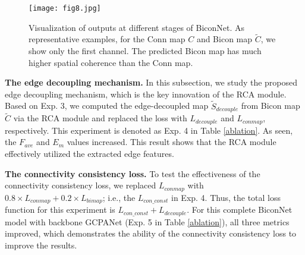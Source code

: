 \documentclass[final]{cvpr}
\begin{document}
\begin{table}[h]
\renewcommand\arraystretch{1.2}
\centering
{}

\end{table}

\begin{figure}[h]
\begin{center}
   \texttt{[image: fig8.jpg]}
\end{center}
\vspace{-8pt}
\caption{Visualization of outputs at different stages of BiconNet. As representative examples, for the Conn map $C$ and Bicon map $\widetilde{C}$, we show only the first channel. The predicted Bicon map has much higher spatial coherence than the Conn map.}
\label{BV_visualization}
\vspace{-10pt}
\end{figure}

\textbf{The edge decoupling mechanism.} In this subsection, we study the proposed edge decoupling mechanism, which is the key innovation of the RCA module. Based on Exp. 3, we computed the edge-decoupled map $\widetilde{S}_{decouple}$ from Bicon map $\widetilde{C}$ via the RCA module and replaced the loss with $L_{decouple}$ and $L_{conmap}$, respectively. This experiment is denoted as Exp. 4 in Table \ref{ablation}. As seen, the $F_{ave}$ and $E_m$ values increased. This result shows that the RCA module effectively utilized the extracted edge features.



\textbf{The connectivity consistency loss.} To test the effectiveness of the connectivity consistency loss, we replaced $L_{conmap}$ with $0.8 \times L_{conmap}+0.2 \times L_{bimap}$; i.e., the $L_{con\_const}$ in Exp. 4. Thus, the total loss function for this experiment is $L_{con\_const}+L_{decouple}$. For this complete BiconNet model with backbone GCPANet (Exp. 5 in Table \ref{ablation}), all three metrics improved, which demonstrates the ability of the connectivity consistency loss to improve the results.
\end{document}
